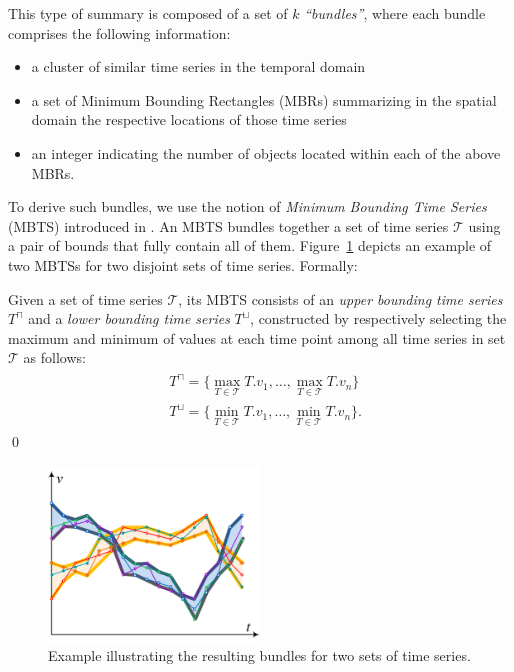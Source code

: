 This type of summary is composed of a set of $k$ {\em ``bundles''}, where each bundle comprises the following information:

\begin{itemize}
\item a cluster of similar time series in the temporal domain
\item a set of Minimum Bounding Rectangles (MBRs) summarizing in the spatial domain the respective locations of those time series
\item an integer indicating the number of objects located within each of the above MBRs.
\end{itemize}

To derive such bundles, we use the notion of {\em Minimum Bounding Time Series} (MBTS) introduced in \cite{chatzig17btsr}. An MBTS bundles together a set of time series  $\mathcal{T}$ using a pair of bounds that fully contain all of them.  Figure~\ref{fig:example_bundle} depicts an example of two MBTSs for two disjoint sets of time series. Formally:

\begin{mydefinition} 
Given a set of time series $\mathcal{T}$, its MBTS consists of an \emph{upper bounding time series} $T^{\sqcap}$ and a \emph{lower bounding time series} $T^{\sqcup}$, constructed by respectively selecting the maximum and minimum of values at each time point among all time series in set $\mathcal{T}$ as follows:
\begin{align}\label{eq:bounds1}
 \begin{split}
  & T^{\sqcap} = \{ \max_{T \in \mathcal{T}} T.v_1, \ldots, \max_{T \in \mathcal{T}} T.v_{n} \} \\
  & T^{\sqcup} = \{ \min_{T \in \mathcal{T}} T.v_1, \ldots, \min_{T \in \mathcal{T}} T.v_{n} \}.
 \end{split}
\end{align}
\qed
\end{mydefinition}


\begin{figure}[t]
	\centering
	\includegraphics[width=0.5\textwidth]{figures/bounds_btsr.png}
	\vspace{-7.5pt}
	\caption{Example illustrating the resulting bundles for two sets of time series.}
	\vspace{-7.5pt}
	\label{fig:example_bundle}
\end{figure}


